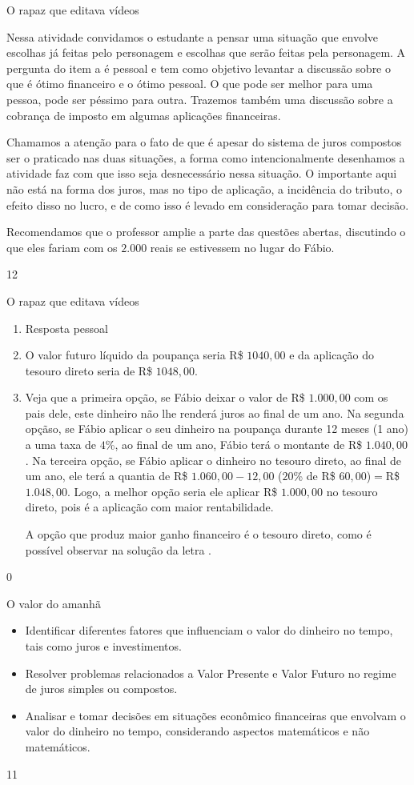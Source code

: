 \begin{sugestions}{O rapaz que editava vídeos}
{
Nessa atividade convidamos o estudante a pensar uma situação que envolve escolhas já feitas pelo personagem e escolhas que serão feitas pela personagem. A pergunta do item a é pessoal e tem como objetivo levantar a discussão sobre o que é ótimo financeiro e o ótimo pessoal. O que pode ser melhor para uma pessoa, pode ser péssimo para outra. Trazemos também uma discussão sobre a cobrança de imposto em algumas aplicações financeiras.

Chamamos a atenção para o fato de que é apesar do sistema de juros compostos ser o praticado nas duas situações, a forma como intencionalmente desenhamos a atividade faz com que isso seja desnecessário nessa situação. O importante aqui não está na forma dos juros, mas no tipo de aplicação, a incidência do tributo, o efeito disso no lucro, e de como isso é levado em consideração para tomar decisão.

Recomendamos que o professor amplie a parte das questões abertas, discutindo o que eles fariam com os $2.000$ reais se estivessem no lugar do Fábio.
}{1}{2}
\end{sugestions}
\begin{answer}{O rapaz que editava vídeos}
{
  \begin{enumerate}
    \item Resposta pessoal
    \item O valor futuro líquido da poupança seria R\$ $1040{,}00$ e da aplicação do tesouro direto seria de R\$ $1048{,}00$.

    \item Veja que a primeira opção, se Fábio deixar o valor de R\$ $1.000{,}00$ com os pais dele, este dinheiro não lhe renderá juros ao final de um ano. Na segunda opçãso, se Fábio aplicar o seu dinheiro na poupança durante 12 meses (1 ano) a uma taxa de $4$\%, ao final de um ano, Fábio terá o montante de R\$ $1.040{,}00$. Na terceira opção, se Fábio aplicar o dinheiro no tesouro direto, ao final de um ano, ele terá a quantia de R\$ $1.060{,}00-12{,}00$ ($20$\% de R\$ $60{,}00$)$=$R\$ $1.048{,}00$. Logo, a melhor opção seria ele aplicar R\$ $1.000,00$ no tesouro direto, pois é a aplicação com maior rentabilidade.

    A opção que produz maior ganho financeiro é o tesouro direto, como é possível observar na solução da letra .
  \end{enumerate}
}{0}
\end{answer}
\clearmargin
\begin{objectives}{O valor do amanhã}
{
\begin{itemize}
\item Identificar diferentes fatores que influenciam o valor do dinheiro no tempo, tais como juros e investimentos.
\item Resolver problemas relacionados a Valor Presente e Valor Futuro no regime de juros simples ou compostos.
\item Analisar e tomar decisões em situações econômico financeiras que envolvam o valor do dinheiro no tempo, considerando aspectos matemáticos e não matemáticos.
\end{itemize}
}{1}{1}
\end{objectives}
